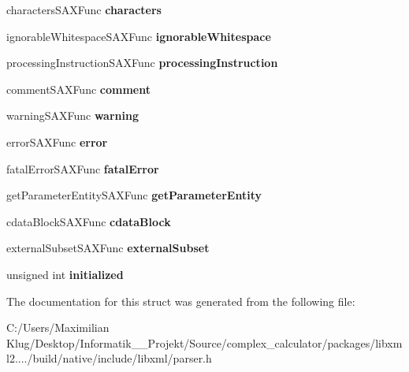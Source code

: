 \begin{DoxyCompactItemize}
characters\+S\+A\+X\+Func {\bfseries characters}
\item 
\mbox{\label{struct__xml_s_a_x_handler_v1_a0d25157139fc3e99e67f0a126dee5d5c}} 
ignorable\+Whitespace\+S\+A\+X\+Func {\bfseries ignorable\+Whitespace}
\item 
\mbox{\label{struct__xml_s_a_x_handler_v1_a2d98ad46baa0f1a03ccca433e7541f65}} 
processing\+Instruction\+S\+A\+X\+Func {\bfseries processing\+Instruction}
\item 
\mbox{\label{struct__xml_s_a_x_handler_v1_a0100dbc90526989b6ef1786d27253f3e}} 
comment\+S\+A\+X\+Func {\bfseries comment}
\item 
\mbox{\label{struct__xml_s_a_x_handler_v1_abd9b23cf8beef529266afe74e9e82dbf}} 
warning\+S\+A\+X\+Func {\bfseries warning}
\item 
\mbox{\label{struct__xml_s_a_x_handler_v1_a944f9de403a5740bf219129523e49130}} 
error\+S\+A\+X\+Func {\bfseries error}
\item 
\mbox{\label{struct__xml_s_a_x_handler_v1_a5b6797dbc24c30062a216c8d9da10ce8}} 
fatal\+Error\+S\+A\+X\+Func {\bfseries fatal\+Error}
\item 
\mbox{\label{struct__xml_s_a_x_handler_v1_a3fa7627b54df41f9b7c4ffc56acf5093}} 
get\+Parameter\+Entity\+S\+A\+X\+Func {\bfseries get\+Parameter\+Entity}
\item 
\mbox{\label{struct__xml_s_a_x_handler_v1_a98acb685255099ea411bec6ba59aa3b1}} 
cdata\+Block\+S\+A\+X\+Func {\bfseries cdata\+Block}
\item 
\mbox{\label{struct__xml_s_a_x_handler_v1_abed7b7b3c670bd6dceeffaf9ed7ea91d}} 
external\+Subset\+S\+A\+X\+Func {\bfseries external\+Subset}
\item 
\mbox{\label{struct__xml_s_a_x_handler_v1_aeed93655a47b1ea5c82a540b5843fa79}} 
unsigned int {\bfseries initialized}
\end{DoxyCompactItemize}


The documentation for this struct was generated from the following file\+:\begin{DoxyCompactItemize}
\item 
C\+:/\+Users/\+Maximilian Klug/\+Desktop/\+Informatik\+\_\+\_\+\+Projekt/\+Source/complex\+\_\+calculator/packages/libxml2..../build/native/include/libxml/parser.\+h\end{DoxyCompactItemize}
